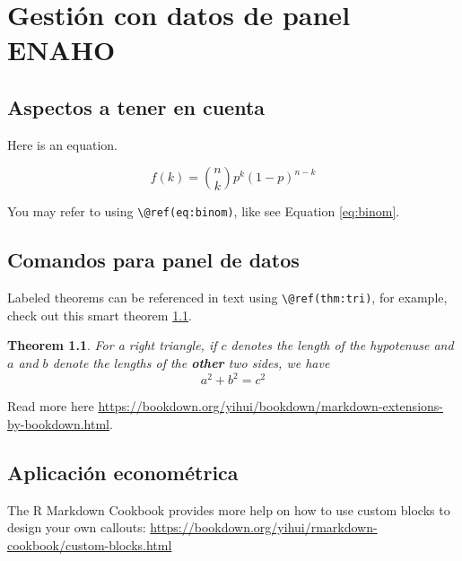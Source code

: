\documentclass[
]{book}
\newtheorem{theorem}{Theorem}[chapter]
\theoremstyle{definition}
\theoremstyle{definition}
\theoremstyle{definition}
\theoremstyle{definition}
\theoremstyle{remark}
\begin{document}
\hypertarget{gestiuxf3n-con-datos-de-panel-enaho}{%
\chapter{Gestión con datos de panel ENAHO}\label{gestiuxf3n-con-datos-de-panel-enaho}}

\hypertarget{aspectos-a-tener-en-cuenta}{%
\section{Aspectos a tener en cuenta}\label{aspectos-a-tener-en-cuenta}}

Here is an equation.

\begin{equation} 
  f\left(k\right) = \binom{n}{k} p^k\left(1-p\right)^{n-k}
  \label{eq:binom}
\end{equation}

You may refer to using \texttt{\textbackslash{}@ref(eq:binom)}, like see Equation \eqref{eq:binom}.

\hypertarget{comandos-para-panel-de-datos}{%
\section{Comandos para panel de datos}\label{comandos-para-panel-de-datos}}

Labeled theorems can be referenced in text using \texttt{\textbackslash{}@ref(thm:tri)}, for example, check out this smart theorem \ref{thm:tri}.

\begin{theorem}
\protect\hypertarget{thm:tri}{}\label{thm:tri}For a right triangle, if \(c\) denotes the \emph{length} of the hypotenuse
and \(a\) and \(b\) denote the lengths of the \textbf{other} two sides, we have
\[a^2 + b^2 = c^2\]
\end{theorem}

Read more here \url{https://bookdown.org/yihui/bookdown/markdown-extensions-by-bookdown.html}.

\hypertarget{aplicaciuxf3n-economuxe9trica}{%
\section{Aplicación econométrica}\label{aplicaciuxf3n-economuxe9trica}}

The R Markdown Cookbook provides more help on how to use custom blocks to design your own callouts: \url{https://bookdown.org/yihui/rmarkdown-cookbook/custom-blocks.html}
\end{document}
